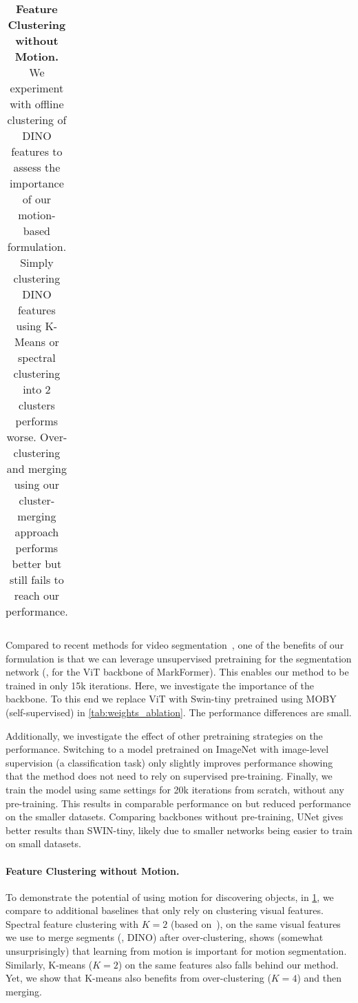 \begin{table}[t]
\begin{center}
\begin{tabular}{lccccc}
\bottomrule
\end{tabular}
\end{center}
\caption{\textbf{Feature Clustering without Motion.} We experiment with offline clustering of DINO features to assess the importance of our motion-based formulation. Simply clustering DINO features using K-Means or spectral clustering \cite{melas-kyriazi2022deep} into 2 clusters performs worse. Over-clustering and merging using our cluster-merging approach performs better but still fails to reach our performance.}
\label{tab:dino_ablation}
\end{table} 
Compared to recent methods for video segmentation~\cite{yang2021self-supervised,meunier2022em-driven}, one of the benefits of our formulation is that we can leverage unsupervised pretraining for the segmentation network (\eg, for the ViT backbone of MarkFormer).
This enables our method to be trained in only 15k iterations.
Here, we investigate the importance of the backbone. To this end we replace ViT with Swin-tiny pretrained using MOBY (self-supervised) in \cref{tab:weights_ablation}. The performance differences are small.

Additionally, we investigate the effect of other pretraining strategies on the performance.
Switching to a model pretrained on ImageNet with image-level supervision (\ie a classification task) 
only slightly improves performance showing that the method does not need to rely on supervised pre-training. Finally, we train the model using same settings for 20k iterations from scratch, without any pre-training.
This results in comparable performance on \DAVIS but reduced performance on the smaller datasets.
Comparing backbones without pre-training, UNet gives better results than SWIN-tiny, likely due to smaller networks being easier to train on small datasets.








\paragraph{Feature Clustering without Motion.}
To demonstrate the potential of using motion for discovering objects, in \cref{tab:dino_ablation}, we compare to additional baselines that only rely on clustering visual features. Spectral feature clustering with $K=2$ (based on~\cite{melas-kyriazi2022deep}), on the same visual features we use to merge segments (\ie, DINO) after over-clustering, shows (somewhat unsurprisingly) that learning from motion is important for motion segmentation. Similarly, K-means ($K=2$) on the same features also falls behind our method. Yet, we show that K-means also benefits from over-clustering ($K=4$) and then merging. 

